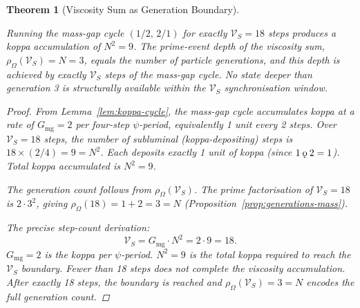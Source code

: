 \documentclass[11pt, letterpaper]{article}
\newcommand{\koppa}{\mathbin{\text{\rm\k{o}}}}
\newcommand{\VS}{\mathcal{V}_S}
\theoremstyle{definition}
\theoremstyle{plain}
\newtheorem{theorem}{Theorem}[section]
\begin{document}
\begin{theorem}[Viscosity Sum as Generation Boundary]\label{thm:vsbound}
\begin{rsbox}
Running the mass-gap cycle $(1/2,\, 2/1)$ for exactly $\VS = 18$ steps produces a koppa accumulation of $N^2 = 9$. The prime-event depth of the viscosity sum, $\rho_\Omega(\VS) = N = 3$, equals the number of particle generations, and this depth is achieved by exactly $\VS$ steps of the mass-gap cycle. No state deeper than generation 3 is structurally available within the $\VS$ synchronisation window.
\end{rsbox}
\begin{proof}
From Lemma~\ref{lem:koppa-cycle}, the mass-gap cycle accumulates koppa at a rate of $G_{\mathrm{mg}} = 2$ per four-step $\psi$-period, equivalently 1 unit every 2 steps. Over $\VS = 18$ steps, the number of subluminal (koppa-depositing) steps is $18 \times (2/4) = 9 = N^2$. Each deposits exactly 1 unit of koppa (since $1 \koppa 2 = 1$). Total koppa accumulated is $N^2 = 9$.

The generation count follows from $\rho_\Omega(\VS)$. The prime factorisation of $\VS = 18$ is $2 \cdot 3^2$, giving $\rho_\Omega(18) = 1 + 2 = 3 = N$ (Proposition~\ref{prop:generations-mass}).

The precise step-count derivation:
\[
\VS = G_{\mathrm{mg}} \cdot N^2 = 2 \cdot 9 = 18.
\]
$G_{\mathrm{mg}} = 2$ is the koppa per $\psi$-period. $N^2 = 9$ is the total koppa required to reach the $\VS$ boundary. Fewer than 18 steps does not complete the viscosity accumulation. After exactly 18 steps, the boundary is reached and $\rho_\Omega(\VS) = 3 = N$ encodes the full generation count.
\end{proof}
\end{theorem}
\end{document}
